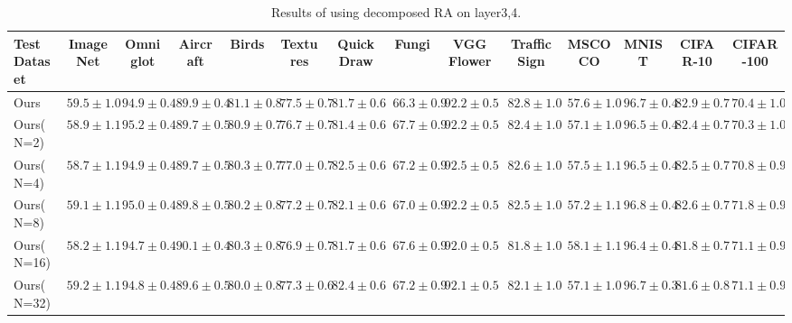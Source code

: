 \begin{table*}[t]
	\centering
    \resizebox{1.0\textwidth}{!}
    {
		\begin{tabular}{lcccccccc|ccccc}

		    \toprule
		    Test Dataset & ImageNet & Omniglot & Aircraft & Birds & Textures & Quick Draw & Fungi & VGG Flower & Traffic Sign & MSCOCO & MNIST & CIFAR-10 & CIFAR-100\\
		    \midrule
		    Ours & $59.5 \pm 1.0$ & $94.9 \pm 0.4$ & $89.9 \pm 0.4$ & $81.1 \pm 0.8$ & $77.5 \pm 0.7$ & $81.7 \pm 0.6$ & $66.3 \pm 0.9$ & $92.2 \pm 0.5$ & $82.8 \pm 1.0$ & $57.6 \pm 1.0$ & $96.7 \pm 0.4$ & $82.9 \pm 0.7$ & $70.4 \pm 1.0$ \\
		    Ours(N=2) & $58.9 \pm 1.1$ & $95.2 \pm 0.4$ & $89.7 \pm 0.5$ & $80.9 \pm 0.7$ & $76.7 \pm 0.7$ & $81.4 \pm 0.6$ & $67.7 \pm 0.9$ & $92.2 \pm 0.5$ & $82.4 \pm 1.0$ & $57.1 \pm 1.0$ & $96.5 \pm 0.4$ & $82.4 \pm 0.7$ & $70.3 \pm 1.0$ \\
		    Ours(N=4) & $58.7 \pm 1.1$ & $94.9 \pm 0.4$ & $89.7 \pm 0.5$ & $80.3 \pm 0.7$ & $77.0 \pm 0.7$ & $82.5 \pm 0.6$ & $67.2 \pm 0.9$ & $92.5 \pm 0.5$ & $82.6 \pm 1.0$ & $57.5 \pm 1.1$ & $96.5 \pm 0.4$ & $82.5 \pm 0.7$ & $70.8 \pm 0.9$ \\
		    Ours(N=8) & $59.1 \pm 1.1$ & $95.0 \pm 0.4$ & $89.8 \pm 0.5$ & $80.2 \pm 0.8$ & $77.2 \pm 0.7$ & $82.1 \pm 0.6$ & $67.0 \pm 0.9$ & $92.2 \pm 0.5$ & $82.5 \pm 1.0$ & $57.2 \pm 1.1$ & $96.8 \pm 0.4$ & $82.6 \pm 0.7$ & $71.8 \pm 0.9$ \\
		    Ours(N=16) & $58.2 \pm 1.1$ & $94.7 \pm 0.4$ & $90.1 \pm 0.4$ & $80.3 \pm 0.8$ & $76.9 \pm 0.7$ & $81.7 \pm 0.6$ & $67.6 \pm 0.9$ & $92.0 \pm 0.5$ & $81.8 \pm 1.0$ & $58.1 \pm 1.1$ & $96.4 \pm 0.4$ & $81.8 \pm 0.7$ & $71.1 \pm 0.9$ \\
		    Ours(N=32) & $59.2 \pm 1.1$ & $94.8 \pm 0.4$ & $89.6 \pm 0.5$ & $80.0 \pm 0.8$ & $77.3 \pm 0.6$ & $82.4 \pm 0.6$ & $67.2 \pm 0.9$ & $92.1 \pm 0.5$ & $82.1 \pm 1.0$ & $57.1 \pm 1.0$ & $96.7 \pm 0.3$ & $81.6 \pm 0.8$ & $71.1 \pm 0.9$ \\
			\bottomrule
		\end{tabular}%
			}
		\vspace{-0.15cm}
		\caption{Results of using decomposed RA on layer3,4.}
		\label{supptab:decoml34}
\end{table*}%

